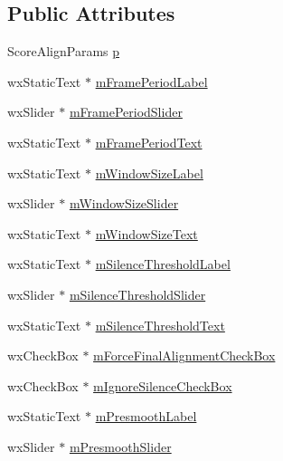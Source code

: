 \subsection*{Public Attributes}
\begin{DoxyCompactItemize}
\item 
Score\+Align\+Params \hyperlink{class_score_align_dialog_abca25b3b674e42187c3ca190e6c03a5d}{p}
\item 
wx\+Static\+Text $\ast$ \hyperlink{class_score_align_dialog_ab408f74fc2c570780911d012c4204ae7}{m\+Frame\+Period\+Label}
\item 
wx\+Slider $\ast$ \hyperlink{class_score_align_dialog_a28b06a137fb914700d79f8675b622281}{m\+Frame\+Period\+Slider}
\item 
wx\+Static\+Text $\ast$ \hyperlink{class_score_align_dialog_a05c2a0ba15968eac2f0ed4d6540c8dad}{m\+Frame\+Period\+Text}
\item 
wx\+Static\+Text $\ast$ \hyperlink{class_score_align_dialog_acac42fd64ebc2ad8581b84ef7eb4d703}{m\+Window\+Size\+Label}
\item 
wx\+Slider $\ast$ \hyperlink{class_score_align_dialog_a804aadde6fe8a04675fb55e99d274d8a}{m\+Window\+Size\+Slider}
\item 
wx\+Static\+Text $\ast$ \hyperlink{class_score_align_dialog_a379cb8b01070bdc4f8191464918f1cc0}{m\+Window\+Size\+Text}
\item 
wx\+Static\+Text $\ast$ \hyperlink{class_score_align_dialog_a92aa136b50ca96ba9815bcdb3322d249}{m\+Silence\+Threshold\+Label}
\item 
wx\+Slider $\ast$ \hyperlink{class_score_align_dialog_a71c03fdeb899de5c5abe184d96fa5fd3}{m\+Silence\+Threshold\+Slider}
\item 
wx\+Static\+Text $\ast$ \hyperlink{class_score_align_dialog_a64ec976e4604069c0510f1aefa6b57f4}{m\+Silence\+Threshold\+Text}
\item 
wx\+Check\+Box $\ast$ \hyperlink{class_score_align_dialog_af4f0ed43597b7062264df46f75cddb86}{m\+Force\+Final\+Alignment\+Check\+Box}
\item 
wx\+Check\+Box $\ast$ \hyperlink{class_score_align_dialog_ac0a9f12b9c2fcb9d13923b94fed1ea71}{m\+Ignore\+Silence\+Check\+Box}
\item 
wx\+Static\+Text $\ast$ \hyperlink{class_score_align_dialog_a09552afb3fa1d2b012f04783fc220cec}{m\+Presmooth\+Label}
\item 
wx\+Slider $\ast$ \hyperlink{class_score_align_dialog_a18099a52f4dc76df66377b8cebc3bff1}{m\+Presmooth\+Slider}
\item 

\end{DoxyCompactItemize}
